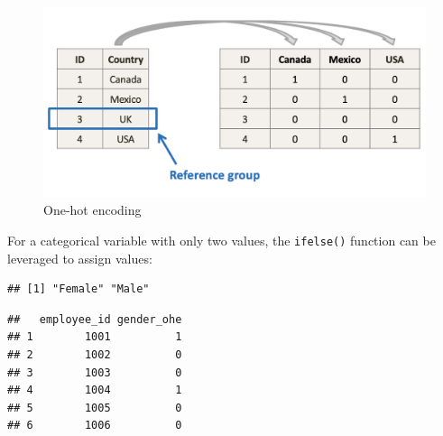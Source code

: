 \documentclass[
]{book}
\newenvironment{Shaded}{\begin{snugshade}}{\end{snugshade}}
\newcommand{\AttributeTok}[1]{\textcolor[rgb]{0.77,0.63,0.00}{#1}}
\newcommand{\CommentTok}[1]{\textcolor[rgb]{0.56,0.35,0.01}{\textit{#1}}}
\newcommand{\DecValTok}[1]{\textcolor[rgb]{0.00,0.00,0.81}{#1}}
\newcommand{\FunctionTok}[1]{\textcolor[rgb]{0.00,0.00,0.00}{#1}}
\newcommand{\NormalTok}[1]{#1}
\newcommand{\OtherTok}[1]{\textcolor[rgb]{0.56,0.35,0.01}{#1}}
\newcommand{\SpecialCharTok}[1]{\textcolor[rgb]{0.00,0.00,0.00}{#1}}
\newcommand{\StringTok}[1]{\textcolor[rgb]{0.31,0.60,0.02}{#1}}
\begin{document}
\begin{figure}

{\centering \includegraphics[width=0.75\linewidth]{graphics/onehot_encoding} 

}

\caption{One-hot encoding}\label{fig:onehot-encoding}
\end{figure}

For a categorical variable with only two values, the \texttt{ifelse()} function can be leveraged to assign values:

\begin{Shaded}
\end{Shaded}

\begin{verbatim}
## [1] "Female" "Male"
\end{verbatim}

\begin{Shaded}
\end{Shaded}

\begin{verbatim}
##   employee_id gender_ohe
## 1        1001          1
## 2        1002          0
## 3        1003          0
## 4        1004          1
## 5        1005          0
## 6        1006          0
\end{verbatim}
\end{document}
